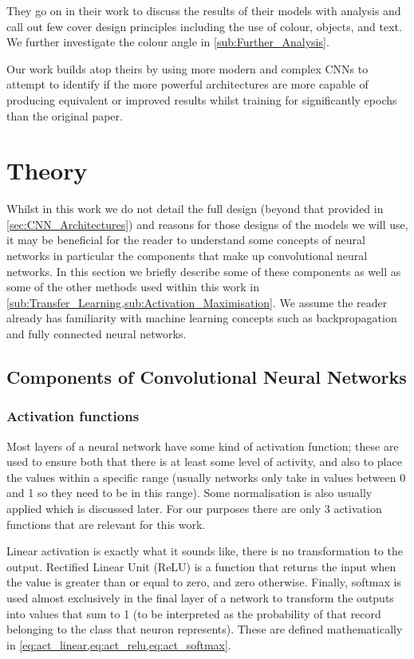\documentclass[12pt]{article}
\numberwithin{equation}{section}
\numberwithin{figure}{section}
\begin{document}
They go on in their work to discuss the results of their models with analysis and call out few cover design principles including the use of colour, objects, and text. We further investigate the colour angle in \cref{sub:Further_Analysis}.

Our work builds atop theirs by using more modern and complex CNNs to attempt to identify if the more powerful architectures are more capable of producing equivalent or improved results whilst training for significantly epochs than the original paper.
\section{Theory} 
\label{sec:Theory} 
Whilst in this work we do not detail the full design (beyond that provided in \cref{sec:CNN_Architectures}) and reasons for those designs of the models we will use, it may be beneficial for the reader to understand some concepts of neural networks in particular the components that make up convolutional neural networks. In this section we briefly describe some of these components as well as some of the other methods used within this work in \cref{sub:Transfer_Learning,sub:Activation_Maximisation}. We assume the reader already has familiarity with machine learning concepts such as backpropagation and fully connected neural networks.
\subsection{Components of Convolutional Neural Networks} 
\label{sub:Components_of_Convolutional_Neural_Networks} 
\subsubsection{Activation functions}
Most layers of a neural network have some kind of activation function; these are used to ensure both that there is at least some level of activity, and also to place the values within a specific range (usually networks only take in values between 0 and 1 so they need to be in this range). Some normalisation is also usually applied which is discussed later. For our purposes there are only 3 activation functions that are relevant for this work.

Linear activation is exactly what it sounds like, there is no transformation to the output. Rectified Linear Unit (ReLU) is a function that returns the input when the value is greater than or equal to zero, and zero otherwise. Finally, softmax is used almost exclusively in the final layer of a network to transform the outputs into values that sum to 1 (to be interpreted as the probability of that record belonging to the class that neuron represents). These are defined mathematically in \cref{eq:act_linear,eq:act_relu,eq:act_softmax}.
\end{document}
